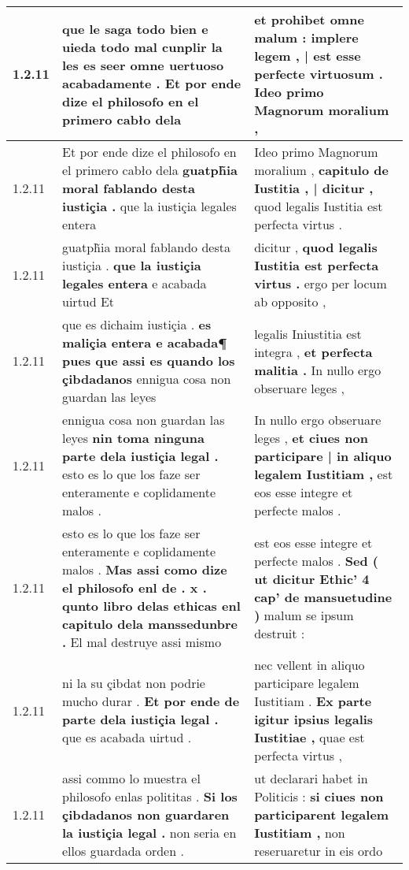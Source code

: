 \begin{tabular}{|p{1cm}|p{6.5cm}|p{6.5cm}|}
1.2.11 & que le saga todo bien \textbf{ e uieda todo mal cunplir la les es seer omne uertuoso acabadamente . } Et por ende dize el philosofo en el primero cabło dela & et prohibet omne malum : \textbf{ implere legem , | est esse perfecte virtuosum . } Ideo primo Magnorum moralium , \\\hline
1.2.11 & Et por ende dize el philosofo en el primero cabło dela \textbf{ guatph̃ia moral fablando desta iustiçia . } que la iustiçia legales entera & Ideo primo Magnorum moralium , \textbf{ capitulo de Iustitia , | dicitur , } quod legalis Iustitia est perfecta virtus . \\\hline
1.2.11 & guatph̃ia moral fablando desta iustiçia . \textbf{ que la iustiçia legales entera } e acabada uirtud Et & dicitur , \textbf{ quod legalis Iustitia est perfecta virtus . } ergo per locum ab opposito , \\\hline
1.2.11 & que es dichaim iustiçia . \textbf{ es maliçia entera e acabada¶ pues que assi es quando los çibdadanos } ennigua cosa non guardan las leyes & legalis Iniustitia est integra , \textbf{ et perfecta malitia . } In nullo ergo obseruare leges , \\\hline
1.2.11 & ennigua cosa non guardan las leyes \textbf{ nin toma ninguna parte dela iustiçia legal . } esto es lo que los faze ser enteramente e coplidamente malos . & In nullo ergo obseruare leges , \textbf{ et ciues non participare | in aliquo legalem Iustitiam , } est eos esse integre et perfecte malos . \\\hline
1.2.11 & esto es lo que los faze ser enteramente e coplidamente malos . \textbf{ Mas assi como dize el philosofo enl de . x . qunto libro delas ethicas enl capitulo dela manssedunbre . } El mal destruye assi mismo & est eos esse integre et perfecte malos . \textbf{ Sed ( ut dicitur Ethic’ 4 cap’ de mansuetudine ) } malum se ipsum destruit : \\\hline
1.2.11 & ni la su çibdat non podrie mucho durar . \textbf{ Et por ende de parte dela iustiçia legal . } que es acabada uirtud . & nec vellent in aliquo participare legalem Iustitiam . \textbf{ Ex parte igitur ipsius legalis Iustitiae , } quae est perfecta virtus , \\\hline
1.2.11 & assi commo lo muestra el philosofo enlas polititas . \textbf{ Si los çibdadanos non guardaren la iustiçia legal . } non seria en ellos guardada orden . & ut declarari habet in Politicis : \textbf{ si ciues non participarent legalem Iustitiam , } non reseruaretur in eis ordo \\\hline

\end{tabular}
